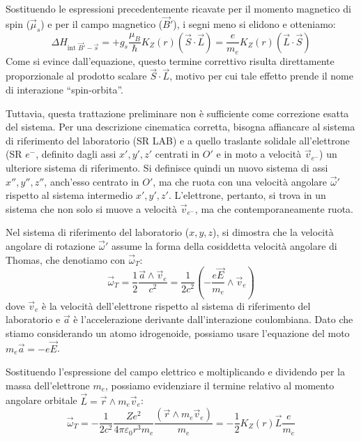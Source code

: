 Sostituendo le espressioni precedentemente ricavate per il momento magnetico di spin (\(\vec{\mu}_s\)) e per il campo magnetico (\(\vec{B}'\)), i segni meno si elidono e otteniamo:
\begin{equation}
    \Delta H_{\text{int } \vec{B}'-\vec{s}} = + g_s \frac{\mu_B}{\hbar} K_Z(r) (\vec{S} \cdot \vec{L}) = \frac{e}{m_e} K_Z(r) (\vec{L} \cdot \vec{S})
\end{equation}
Come si evince dall'equazione, questo termine correttivo risulta direttamente proporzionale al prodotto scalare \(\vec{S} \cdot \vec{L}\), motivo per cui tale effetto prende il nome di interazione ``spin-orbita''.

Tuttavia, questa trattazione preliminare non è sufficiente come correzione esatta del sistema. Per una descrizione cinematica corretta, bisogna affiancare al sistema di riferimento del laboratorio (SR LAB) e a quello traslante solidale all'elettrone (SR \(e^-\), definito dagli assi \(x', y', z'\) centrati in \(O'\) e in moto a velocità \(\vec{v}_{e^-}\)) un ulteriore sistema di riferimento. Si definisce quindi un nuovo sistema di assi \(x'', y'', z''\), anch'esso centrato in \(O'\), ma che ruota con una velocità angolare \(\vec{\omega}'\) rispetto al sistema intermedio \(x', y', z'\). L'elettrone, pertanto, si trova in un sistema che non solo si muove a velocità \(\vec{v}_{e^-}\), ma che contemporaneamente ruota.

Nel sistema di riferimento del laboratorio (\(x,y,z\)), si dimostra che la velocità angolare di rotazione \(\vec{\omega}'\) assume la forma della cosiddetta velocità angolare di Thomas, che denotiamo con \(\vec{\omega}_T\):
\begin{equation}
    \vec{\omega}_T = \frac{1}{2} \frac{\vec{a} \wedge \vec{v}_e}{c^2} = \frac{1}{2c^2} \left( -\frac{e\vec{E}}{m_e} \wedge \vec{v}_e \right)
\end{equation}
dove \(\vec{v}_e\) è la velocità dell'elettrone rispetto al sistema di riferimento del laboratorio e \(\vec{a}\) è l'accelerazione derivante dall'interazione coulombiana. Dato che stiamo considerando un atomo idrogenoide, possiamo usare l'equazione del moto \(m_e \vec{a} = -e\vec{E}\).

Sostituendo l'espressione del campo elettrico e moltiplicando e dividendo per la massa dell'elettrone \(m_e\), possiamo evidenziare il termine relativo al momento angolare orbitale \(\vec{L} = \vec{r} \wedge m_e \vec{v}_e\):
\begin{equation}
    \vec{\omega}_T = - \frac{1}{2c^2} \frac{Ze^2}{4\pi\varepsilon_0 r^3 m_e} \frac{(\vec{r} \wedge m_e \vec{v}_e)}{m_e} = - \frac{1}{2} K_Z(r) \vec{L} \frac{e}{m_e}
\end{equation}

